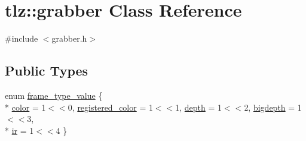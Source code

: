 \hypertarget{classtlz_1_1grabber}{}\section{tlz\+:\+:grabber Class Reference}
\label{classtlz_1_1grabber}


{\ttfamily \#include $<$grabber.\+h$>$}

\subsection*{Public Types}
\begin{DoxyCompactItemize}
\item 
enum \hyperlink{classtlz_1_1grabber_a52a1a6be5144a2985397431f66427f0c}{frame\+\_\+type\+\_\+value} \{ \\*
\hyperlink{classtlz_1_1grabber_a52a1a6be5144a2985397431f66427f0ca8dfcdc862beb43d63a391cee678ae0b7}{color} = 1$<$$<$0, 
\hyperlink{classtlz_1_1grabber_a52a1a6be5144a2985397431f66427f0cadc2bdd14f9e504fa0d8dc3da41df69a3}{registered\+\_\+color} = 1$<$$<$1, 
\hyperlink{classtlz_1_1grabber_a52a1a6be5144a2985397431f66427f0ca9fb1f55fe880a3eee634e02d509048b2}{depth} = 1$<$$<$2, 
\hyperlink{classtlz_1_1grabber_a52a1a6be5144a2985397431f66427f0ca37703dee7885ad239262f3b4dadab1e9}{bigdepth} = 1$<$$<$3, 
\\*
\hyperlink{classtlz_1_1grabber_a52a1a6be5144a2985397431f66427f0caed13499938172b3f78d3444b93a25d0f}{ir} = 1$<$$<$4
 \}
\end{DoxyCompactItemize}
